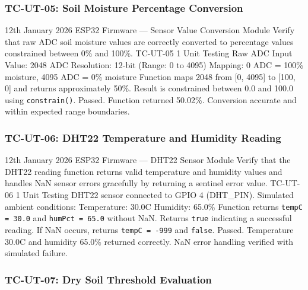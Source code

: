 \subsubsection{TC-UT-05: Soil Moisture Percentage Conversion}

\testcase%
{12th January 2026}%
{ESP32 Firmware --- Sensor Value Conversion Module}%
{Verify that raw ADC soil moisture values are correctly
converted to percentage values constrained between
0\% and 100\%.}%
{TC-UT-05}%
{1}%
{Unit Testing}%
{Raw ADC Input Value: 2048 \newline
ADC Resolution: 12-bit (Range: 0 to 4095) \newline
Mapping: 0 ADC = 100\% moisture, 4095 ADC = 0\% moisture}%
{Function maps 2048 from [0, 4095] to [100, 0] and returns
approximately 50\%. Result is constrained between 0.0 and
100.0 using \texttt{constrain()}.}%
{Passed. Function returned 50.02\%. Conversion accurate and
within expected range boundaries.}

\subsubsection{TC-UT-06: DHT22 Temperature and Humidity Reading}

\testcase%
{12th January 2026}%
{ESP32 Firmware --- DHT22 Sensor Module}%
{Verify that the DHT22 reading function returns valid
temperature and humidity values and handles NaN sensor
errors gracefully by returning a sentinel error value.}%
{TC-UT-06}%
{1}%
{Unit Testing}%
{DHT22 sensor connected to GPIO 4 (DHT\_PIN). \newline
Simulated ambient conditions: \newline
Temperature: 30.0\textdegree{}C \newline
Humidity: 65.0\%}%
{Function returns \texttt{tempC = 30.0} and
\texttt{humPct = 65.0} without NaN. Returns \texttt{true}
indicating a successful reading. If NaN occurs, returns
\texttt{tempC = -999} and \texttt{false}.}%
{Passed. Temperature 30.0\textdegree{}C and humidity 65.0\%
returned correctly. NaN error handling verified with
simulated failure.}

\subsubsection{TC-UT-07: Dry Soil Threshold Evaluation}

